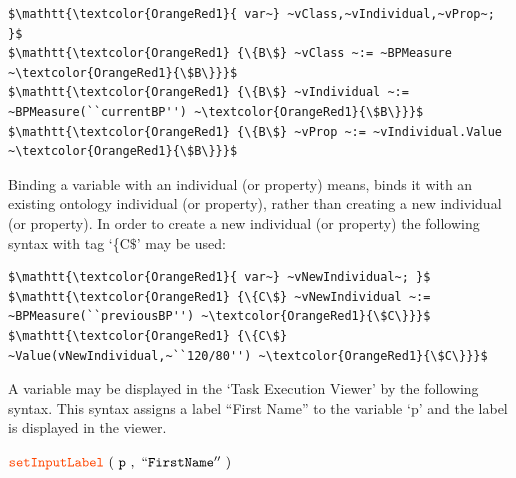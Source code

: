 \documentclass[a4paper]{llncs}
\begin{document}
{
\footnotesize
{}
\lstset{basicstyle=\ttfamily,identifierstyle=\ttfamily,keywordstyle=\ttfamily}
\lstset{stringstyle=\ttfamily, columns=fullflexible}
\begin{lstlisting}[mathescape=ture,frame=tb,captionpos=b,showspaces=false,showstringspaces=false,showtabs=false,tabsize=2, label=t1]
$\mathtt{\textcolor{OrangeRed1}{ var~} ~vClass,~vIndividual,~vProp~; }$
$\mathtt{\textcolor{OrangeRed1} {\{B\$} ~vClass ~:= ~BPMeasure ~\textcolor{OrangeRed1}{\$B\}}}$
$\mathtt{\textcolor{OrangeRed1} {\{B\$} ~vIndividual ~:= ~BPMeasure(``currentBP'') ~\textcolor{OrangeRed1}{\$B\}}}$
$\mathtt{\textcolor{OrangeRed1} {\{B\$} ~vProp ~:= ~vIndividual.Value ~\textcolor{OrangeRed1}{\$B\}}}$
\end{lstlisting}
}
\normalsize{}

\noindent
Binding a variable with an individual (or property) means, binds it with an existing ontology individual (or property), rather than creating a new individual (or property). 
In order to create a new individual (or property) the following syntax with tag `\{C$\$$' may be used: 

{
\footnotesize
{}
\lstset{basicstyle=\ttfamily,identifierstyle=\ttfamily,keywordstyle=\ttfamily}
\lstset{stringstyle=\ttfamily, columns=fullflexible}
\begin{lstlisting}[mathescape=ture,frame=tb,captionpos=b,showspaces=false,showstringspaces=false,showtabs=false,tabsize=2, label=t1]
$\mathtt{\textcolor{OrangeRed1}{ var~} ~vNewIndividual~; }$
$\mathtt{\textcolor{OrangeRed1} {\{C\$} ~vNewIndividual ~:= ~BPMeasure(``previousBP'') ~\textcolor{OrangeRed1}{\$C\}}}$
$\mathtt{\textcolor{OrangeRed1} {\{C\$} ~Value(vNewIndividual,~``120/80'') ~\textcolor{OrangeRed1}{\$C\}}}$
\end{lstlisting}
}
\normalsize{}

\noindent
A variable may be displayed in the `Task Execution Viewer' by the following syntax. This syntax assigns a label ``First Name'' to the variable `p' and the label is displayed in the viewer. 

{
\footnotesize
{}
\lstset{basicstyle=\ttfamily,identifierstyle=\ttfamily,keywordstyle=\ttfamily}
\lstset{stringstyle=\ttfamily, columns=fullflexible}
$\mathtt{\textcolor{OrangeRed1}{ setInputLabel}~(~p~,~``First Name''~) }$
}
\normalsize{}
\end{document}
